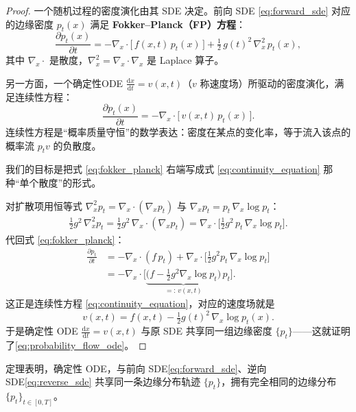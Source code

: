 \begin{proof}
一个随机过程的密度演化由其 SDE 决定。前向 SDE \eqref{eq:forward_sde} 对应的边缘密度 $p_t(x)$ 满足 \textbf{Fokker–Planck（FP）方程}：
\begin{equation}\label{eq:fokker_planck}
\frac{\partial p_t(x)}{\partial t}
= -\nabla_x\cdot\big[\,f(x,t)\,p_t(x)\,\big]
+ \tfrac12\,g(t)^2\,\nabla_x^2\, p_t(x),
\tag{3.4}
\end{equation}
其中 $\nabla_x\cdot$ 是散度，$\nabla_x^2 = \nabla_x\cdot\nabla_x$ 是 Laplace 算子。

另一方面，一个确定性ODE $\frac{\mathrm{d}x}{\mathrm{d}t}=v(x,t)$（$v$ 称速度场）所驱动的密度演化，满足连续性方程：
\begin{equation}\label{eq:continuity_equation}
\frac{\partial p_t(x)}{\partial t} = -\nabla_x\cdot\big[\,v(x,t)\,p_t(x)\,\big].
\tag{3.5}
\end{equation}
连续性方程是“概率质量守恒”的数学表达：密度在某点的变化率，等于流入该点的概率流 $p_t v$ 的负散度。


我们的目标是把式 \eqref{eq:fokker_planck} 右端写成式 \eqref{eq:continuity_equation} 那种“单个散度”的形式。

对扩散项用恒等式 $\nabla_x^2 p_t = \nabla_x\cdot(\nabla_x p_t)$ 与 $\nabla_x p_t = p_t\,\nabla_x\log p_t$：
\begin{align}
\tfrac12 g^2\,\nabla_x^2 p_t
= \tfrac12 g^2\,\nabla_x\cdot(\nabla_x p_t)
= \nabla_x\cdot\Big[\tfrac12 g^2\, p_t\,\nabla_x\log p_t\Big].
\end{align}
代回式 \eqref{eq:fokker_planck}：
\begin{align}
\frac{\partial p_t}{\partial t}
&= -\nabla_x\cdot(f\,p_t) + \nabla_x\cdot\Big[\tfrac12 g^2 p_t\,\nabla_x\log p_t\Big] \nonumber\\
&= -\nabla_x\cdot\Big[\underbrace{\big(f - \tfrac12 g^2\nabla_x\log p_t\big)}_{=:\,v(x,t)}\,p_t\Big].
\end{align}
这正是连续性方程 \eqref{eq:continuity_equation}，对应的速度场就是
\begin{equation}
v(x,t) = f(x,t) - \tfrac12 g(t)^2\,\nabla_x\log p_t(x).
\end{equation}
于是确定性 ODE $\frac{\mathrm{d}x}{\mathrm{d}t}=v(x,t)$ 与原 SDE 共享同一组边缘密度 $\{p_t\}$——这就证明了\eqref{eq:probability_flow_ode}。
\end{proof}

定理表明，确定性 ODE，与前向 SDE\eqref{eq:forward_sde}、逆向 SDE\eqref{eq:reverse_sde} 共享同一条边缘分布轨迹 $\{p_t\}$，拥有完全相同的边缘分布 $\{p_t\}_{t\in[0,T]}$。

